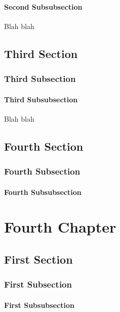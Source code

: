 \documentclass[11pt]{book}
\begin{document}
\subsubsection{Second Subsubsection}

Blah blah

\section{Third Section}

\subsection{Third Subsection}

\subsubsection{Third Subsubsection}

Blah blah

\section{Fourth Section}

\subsection{Fourth Subsection}

\subsubsection{Fourth Subsubsection}

\chapter{Fourth Chapter}

\section{First Section}

\subsection{First Subsection}

\subsubsection{First Subsubsection}
\end{document}
